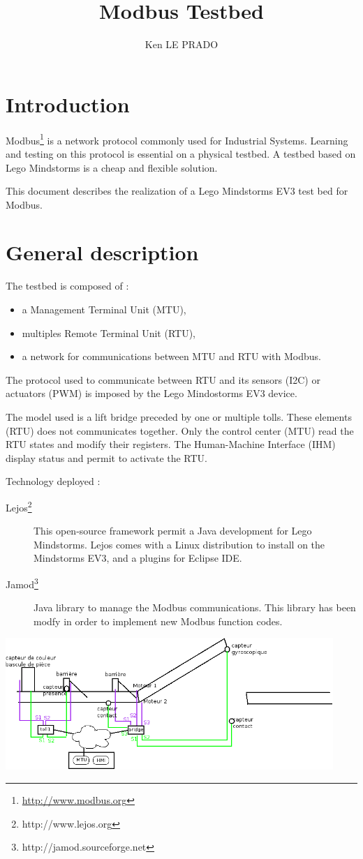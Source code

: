 \documentclass[10pt,a4paper]{article}
\author{Ken LE PRADO}
\title{Modbus Testbed}
\begin{document}
\section{Introduction}
	
	Modbus\footnote{\url{http://www.modbus.org}} is a network protocol commonly used for Industrial Systems.
	Learning and testing on this protocol is essential on a physical testbed.
	A testbed based on Lego Mindstorms is a cheap and flexible solution.
	
	This document describes the realization of a Lego Mindstorms EV3 test bed for Modbus.

\section{General description}
	The testbed is composed of :
	\begin{itemize}
	    \item a Management Terminal Unit (MTU),
	    \item multiples Remote Terminal Unit (RTU),
	    \item a network for communications between MTU and RTU with Modbus.
	\end{itemize}

	The protocol used to communicate between RTU and its sensors (I2C) or actuators (PWM) is imposed by the Lego Mindostorms EV3 device.
		
	The model used is a lift bridge preceded by one or multiple tolls. These elements (RTU) does not communicates together. Only the control center (MTU) read the RTU states and modify their registers. The Human-Machine Interface (IHM) display status and permit to activate the RTU.
	
	
    Technology deployed :    
    \begin{description}
        \item[Lejos\footnote{http://www.lejos.org}] This open-source framework permit a Java development for Lego Mindstorms. Lejos comes with a Linux distribution to install on the Mindstorms EV3, and a plugins for Eclipse IDE.
        \item[Jamod\footnote{http://jamod.sourceforge.net}] Java library to manage the Modbus communications. This library has been modfy in order to implement new Modbus function codes.
    \end{description}
		
	\begin{center}
	\includegraphics[height=5cm]{rsrc/schema_peage-pont.png}
	\end{center}
	
\end{document}
